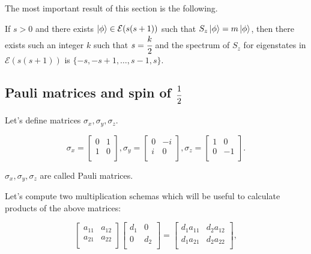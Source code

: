 \documentclass[main.tex]{subfiles}
\begin{document}
The most important result of this section is the following.

\begin{fact}
If $s > 0$ and there exists $\ket{\phi} \in \mathcal{E}(s(s + 1))$ such that $S_z\ket{\phi} = m\ket{\phi}$, then there exists such an integer $k$ such that $s = \cfrac{k}{2}$ and
the spectrum of $S_z$ for eigenstates in $\mathcal{E}(s(s + 1))$ is $\{-s, -s + 1, \dots, s - 1, s\}$.
\end{fact}
\subsection{Pauli matrices and spin of $\cfrac{1}{2}$}
Let's define matrices $\sigma_x, \sigma_y, \sigma_z$.

\begin{equation}
\sigma_x = \begin{bmatrix}
    0 &  1 \\
    1 & 0 \\
\end{bmatrix},
\sigma_y = \begin{bmatrix}
    0 &  -i \\
    i & 0 \\
\end{bmatrix},
\sigma_z = \begin{bmatrix}
    1 &  0 \\
    0 & -1 \\
\end{bmatrix}.
\end{equation}

$\sigma_x, \sigma_y, \sigma_z$ are called Pauli matrices.

Let's compute two multiplication schemas which will be useful to calculate products of the above matrices:

\begin{equation}
\begin{bmatrix}
    a_{11} &  a_{12} \\
    a_{21} & a_{22} \\
\end{bmatrix}
\begin{bmatrix}
    d_1 & 0 \\
    0 & d_2 \\
\end{bmatrix}
= \begin{bmatrix}
    d_1 a_{11} &  d_2 a_{12} \\
    d_1 a_{21} & d_2 a_{22} \\
\end{bmatrix},
\end{equation}
\end{document}
